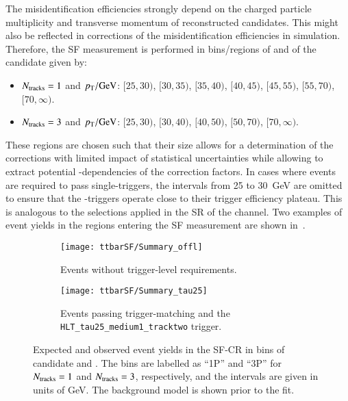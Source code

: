 The \jettotauhadvis misidentification efficiencies strongly depend on the
charged particle multiplicity and transverse momentum of reconstructed
\tauhadvis candidates. This might also be reflected in corrections of the
\jettotauhadvis misidentification efficiencies in simulation. Therefore, the SF
measurement is performed in bins/regions of \Ntracks and \pT of the \tauhadvis
candidate given by:
\begin{itemize}

\item $\Ntracks = 1$ and $\pT / \si{\GeV}$: $[25, 30)$, $[30, 35)$, $[35, 40)$,
  $[40, 45)$, $[45, 55)$, $[55, 70)$, $[70, \infty)$.

\item $\Ntracks = 3$ and $\pT / \si{\GeV}$: $[25, 30)$, $[30, 40)$, $[40, 50)$,
  $[50, 70)$, $[70, \infty)$.

\end{itemize}
These regions are chosen such that their size allows for a determination of the
corrections with limited impact of statistical uncertainties while allowing to
extract potential \pT-dependencies of the correction factors. In cases where
events are required to pass single-\tauhadvis triggers, the \pT intervals from
25 to \SI{30}{\GeV} are omitted to ensure that the \tauhadvis-triggers operate
close to their trigger efficiency plateau. This is analogous to the selections
applied in the SR of the \hadhad channel. Two examples of event yields in the
regions entering the SF measurement are shown
in~.

\begin{figure}[htbp]
  \centering

  \begin{subfigure}[t]{.48\textwidth}
    \texttt{[image: ttbarSF/Summary\_offl]}

    \caption{Events without trigger-level \tauid requirements.}
  \end{subfigure}\hfill%
  \begin{subfigure}[t]{.48\textwidth}
    \texttt{[image: ttbarSF/Summary\_tau25]}

    \caption{Events passing \tauhadvis trigger-matching and the
      \texttt{HLT\_tau25\_medium1\_tracktwo} trigger.}
  \end{subfigure}

  \caption{Expected and observed event yields in the SF-CR in bins of \tauhadvis
    candidate \Ntracks and \pT. The bins are labelled as ``1P'' and ``3P'' for
    $\Ntracks = 1$ and $\Ntracks = 3$, respectively, and the \pT intervals are
    given in units of \si{\GeV}. The background model is shown prior to the
    fit.}%
  \label{fig:ttbarsf_region_summary_prefit}
\end{figure}

